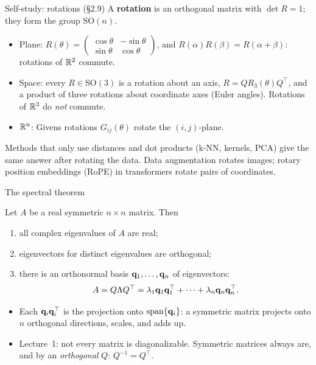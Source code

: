 \documentclass[aspectratio=1610,11pt]{beamer}
\begin{document}
\begin{frame}{Self-study: rotations (\S2.9)}
    \small
    A \textbf{rotation} is an orthogonal matrix with $\det R = 1$; they form the group $\mathrm{SO}(n)$.
    \begin{itemize}
        \item Plane: $R(\theta) = \begin{pmatrix} \cos\theta & -\sin\theta \\ \sin\theta & \cos\theta \end{pmatrix}$, and $R(\alpha)R(\beta) = R(\alpha + \beta)$: rotations of $\mathbb{R}^2$ commute.
        \item Space: every $R \in \mathrm{SO}(3)$ is a rotation about an axis, $R = QR_3(\theta)Q^\top$, and a product of three rotations about coordinate axes (Euler angles). Rotations of $\mathbb{R}^3$ do \emph{not} commute.
        \item $\mathbb{R}^n$: Givens rotations $G_{ij}(\theta)$ rotate the $(i, j)$-plane.
    \end{itemize}
    \begin{mlbox}
        \small Methods that only use distances and dot products (k-NN, kernels, PCA) give the same answer after rotating the data. Data augmentation rotates images; rotary position embeddings (RoPE) in transformers rotate pairs of coordinates.
    \end{mlbox}
\end{frame}


\begin{frame}{The spectral theorem}
    \begin{theorem}
        Let $A$ be a real symmetric $n \times n$ matrix. Then
        \begin{enumerate}
            \item all complex eigenvalues of $A$ are real;
            \item eigenvectors for distinct eigenvalues are orthogonal;
            \item there is an orthonormal basis $\mathbf{q}_1, \ldots, \mathbf{q}_n$ of eigenvectors:
            \[A = Q\Lambda Q^\top = \lambda_1\mathbf{q}_1\mathbf{q}_1^\top + \cdots + \lambda_n\mathbf{q}_n\mathbf{q}_n^\top.\]
        \end{enumerate}
    \end{theorem}
    \small
    \begin{itemize}
        \item Each $\mathbf{q}_i\mathbf{q}_i^\top$ is the projection onto $\operatorname{span}\{\mathbf{q}_i\}$: a symmetric matrix projects onto $n$ orthogonal directions, scales, and adds up.
        \item Lecture~1: not every matrix is diagonalizable. Symmetric matrices always are, and by an \emph{orthogonal} $Q$: $Q^{-1} = Q^\top$.
    \end{itemize}
\end{frame}
\end{document}

